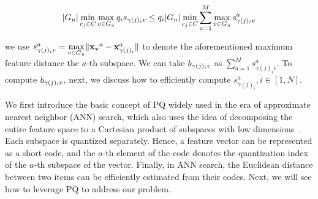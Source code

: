 \begin{equation}\label{eqa:cluster-6}
    \begin{aligned}
        |G_u| \min_{c_j\in C} \max_{v \in G_u} q_i s_{\gamma(j)_iv} \leq q_i |G_u| \min_{c_j\in C} \sum_{a = 1}^M \max_{v \in G_u} s_{\gamma(j)_iv}^a
    \end{aligned}
\end{equation}

\noindent we use $s_{\gamma(j)_iv}^a = \max\limits_{v \in G_u}\lVert \mathbf{x_v}^a - \mathbf{x}^a_{\gamma(j)_i}\rVert$ to denote the aforementioned maximum feature distance \wrt the $a$-th subspace. We can take $b_{\gamma(j)_iv}$ as $\sum_{a=1}^{M} s^a_{\gamma(j)_iv}$. To compute $b_{\gamma(j)_iv}$, next, we  discuss how to efficiently compute  $s_{\gamma(j)_i}^a, i\in [1,N]$.

We first  introduce the basic concept of PQ widely used in the era of approximate nearest neighbor (ANN) search, which also uses the idea of  decomposing the entire feature space to a Cartesian product of subspaces with low dimensions~\cite{}. Each subspace is quantized separately. Hence, a feature vector can be represented as a short code, and the $a$-th element of the code denotes the  quantization index of the $a$-th subspace of the vector. Finally, in ANN search,  the Euclidean distance between two items can be efficiently estimated from their codes. Next, we will see how to leverage PQ to address our problem.


